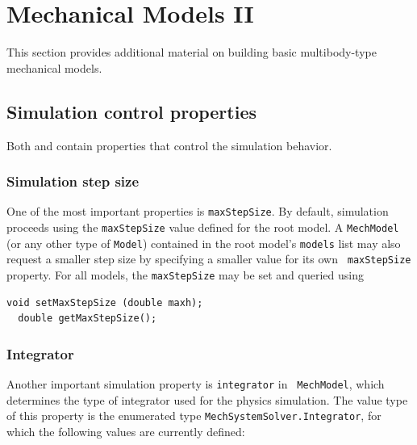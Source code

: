\ifdefined\maindoc\else
\def\doctitle{Mechanical Models II}

\mainmatter
\fi

\def\lfn{\hat{l}_f} %
\def\vfn{\hat{v}_f} %
\def\ltn{\hat{l}_t} %
\def\vmax{V_{m}} %
\def\eps{\epsilon} %
\def\Flen{\bar{F}^M_{len}} %
\chapter{Mechanical Models II}
\label{MechModelsII:sec}

This section provides additional material on building basic
multibody-type mechanical models.

\section{Simulation control properties}

Both  and
 contain properties
that control the simulation behavior. 

\subsection{Simulation step size}

One of the most important properties is {\tt maxStepSize}. By default,
simulation proceeds using the {\tt maxStepSize} value defined for the
root model. A {\tt MechModel} (or any other type of {\tt Model})
contained in the root model's {\tt models} list may also request a
smaller step size by specifying a smaller value for its own {\tt
maxStepSize} property.  For all models, the {\tt maxStepSize} may be
set and queried using
\begin{lstlisting}[]
  void setMaxStepSize (double maxh);
  double getMaxStepSize();
\end{lstlisting}
%

\subsection{Integrator}

Another important simulation property is {\tt integrator} in {\tt
MechModel}, which determines the type of integrator used for the
physics simulation. The value type of this property is the enumerated
type {\tt MechSystemSolver.Integrator}, for which the following values
are currently defined:

